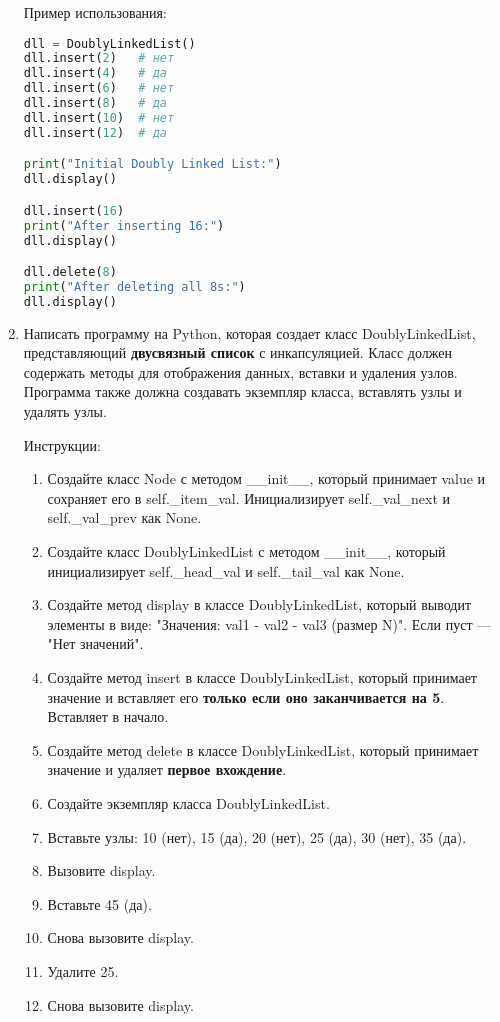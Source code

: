 \begin{enumerate}
Пример использования:
\begin{lstlisting}[language=Python]
dll = DoublyLinkedList()
dll.insert(2)   # нет
dll.insert(4)   # да
dll.insert(6)   # нет
dll.insert(8)   # да
dll.insert(10)  # нет
dll.insert(12)  # да

print("Initial Doubly Linked List:")
dll.display()

dll.insert(16)
print("After inserting 16:")
dll.display()

dll.delete(8)
print("After deleting all 8s:")
dll.display()
\end{lstlisting}

\item Написать программу на Python, которая создает класс DoublyLinkedList, представляющий \textbf{двусвязный список} с инкапсуляцией. Класс должен содержать методы для отображения данных, вставки и удаления узлов. Программа также должна создавать экземпляр класса, вставлять узлы и удалять узлы.

Инструкции:
\begin{enumerate}
    \item Создайте класс Node с методом \_\_init\_\_, который принимает value и сохраняет его в self.\_item\_val. Инициализирует self.\_val\_next и self.\_val\_prev как None.
    \item Создайте класс DoublyLinkedList с методом \_\_init\_\_, который инициализирует self.\_head\_val и self.\_tail\_val как None.
    \item Создайте метод display в классе DoublyLinkedList, который выводит элементы в виде: "Значения: val1 - val2 - val3 (размер N)". Если пуст — "Нет значений".
    \item Создайте метод insert в классе DoublyLinkedList, который принимает значение и вставляет его \textbf{только если оно заканчивается на 5}. Вставляет в начало.
    \item Создайте метод delete в классе DoublyLinkedList, который принимает значение и удаляет \textbf{первое вхождение}.
    \item Создайте экземпляр класса DoublyLinkedList.
    \item Вставьте узлы: 10 (нет), 15 (да), 20 (нет), 25 (да), 30 (нет), 35 (да).
    \item Вызовите display.
    \item Вставьте 45 (да).
    \item Снова вызовите display.
    \item Удалите 25.
    \item Снова вызовите display.
\end{enumerate}


\end{enumerate}
